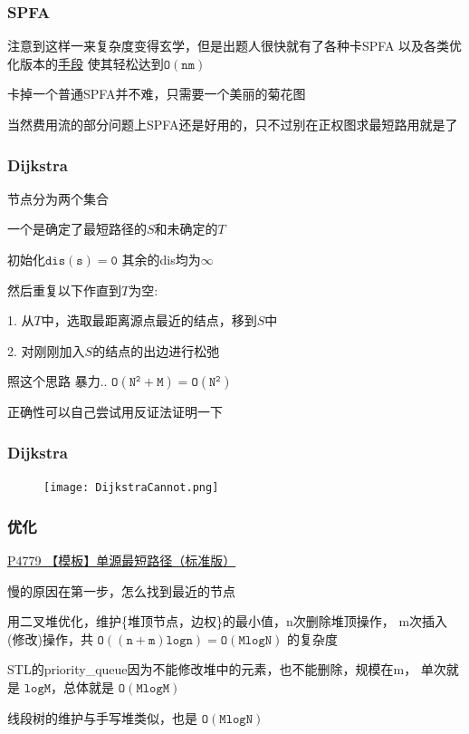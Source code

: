 \documentclass{beamer}
\begin{document}
  \begin{frame}
    \frametitle{SPFA}  

    注意到这样一来复杂度变得玄学，但是出题人很快就有了各种卡SPFA
    以及各类优化版本的\href{https://www.zhihu.com/question/292283275/answer/484871888}{手段}
    使其轻松达到$\mathtt{O(nm)}$
    
    \vspace*{1\baselineskip}
    
    卡掉一个普通SPFA并不难，只需要一个美丽的菊花图
    
    \vspace*{1\baselineskip}
    
    当然费用流的部分问题上SPFA还是好用的，只不过别在正权图求最短路用就是了
  \end{frame}

  \begin{frame}
    \frametitle{Dijkstra}
    节点分为两个集合
    
    一个是确定了最短路径的{$S$}和未确定的{$T$}

    初始化$\mathtt{dis(s)=0}$ 其余的dis均为$\infty$

    然后重复以下作直到$T$为空:

    1. 从{$T$}中，选取最距离源点最近的结点，移到{$S$}中
    
    2. 对刚刚加入{$S$}的结点的出边进行松弛
    
    \vspace*{1\baselineskip}
    
    照这个思路 暴力.. $\mathtt{O(N^2 + M) = O(N ^ 2)}$
    
    \vspace*{1\baselineskip}

    正确性可以自己尝试用反证法证明一下
  \end{frame}
  
  \begin{frame}
    \frametitle{Dijkstra}
    \begin{figure}
      \texttt{[image: DijkstraCannot.png]}
    \end{figure}
  \end{frame}

  \begin{frame}
    \frametitle{优化}
    \href{https://www.luogu.com.cn/problem/P4779}{P4779 【模板】单源最短路径（标准版）}

    慢的原因在第一步，怎么找到最近的节点

    \vspace*{1\baselineskip}
    
    用二叉堆优化，维护\{堆顶节点，边权\}的最小值，n次删除堆顶操作，
    m次插入(修改)操作，共 $\mathtt{O((n+m)logn)=O(MlogN)}$ 的复杂度
    
    \vspace*{1\baselineskip}
    
    STL的priority\_queue因为不能修改堆中的元素，也不能删除，规模在m，
    单次就是 $\mathtt{logM}$，总体就是 $\mathtt{O(MlogM)}$
    
    \vspace*{1\baselineskip}
    
    线段树的维护与手写堆类似，也是 $\mathtt{O(MlogN)}$
  \end{frame}
\end{document}
